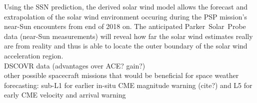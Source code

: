 Using the SSN prediction, the derived solar wind model allows the forecast and extrapolation of the solar wind environment occuring during the PSP mission's near-Sun encounters from end of 2018 on. The anticipated Parker~Solar~Probe data (near-Sun measurements) will reveal how far the solar wind estimates really are from reality and thus is able to locate the outer boundary of the solar wind acceleration region.\\

DSCOVR data (advantages over ACE? gain?)\\

other possible spacecraft missions that would be beneficial for space weather forecasting: sub-L1 for earlier in-situ CME magnitude warning (cite?) and L5 for early CME velocity and arrival warning \citep{Vourlidas2015}\\




